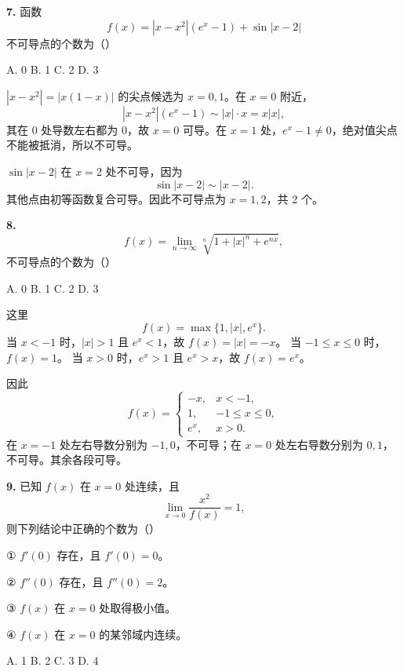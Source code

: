 \begin{problemblock}
\textbf{7.} 函数
\[
f(x)=|x-x^2|(e^x-1)+\sin|x-2|
\]
不可导点的个数为（\quad）

A. 0 \qquad B. 1 \qquad C. 2 \qquad D. 3
\end{problemblock}

\begin{solutionblock}
\(|x-x^2|=|x(1-x)|\) 的尖点候选为 \(x=0,1\)。在 \(x=0\) 附近，
\[
|x-x^2|(e^x-1)\sim |x|\cdot x=x|x|,
\]
其在 0 处导数左右都为 0，故 \(x=0\) 可导。在 \(x=1\) 处，\(e^x-1\ne0\)，绝对值尖点不能被抵消，所以不可导。

\(\sin|x-2|\) 在 \(x=2\) 处不可导，因为
\[
\sin|x-2|\sim |x-2|.
\]
其他点由初等函数复合可导。因此不可导点为 \(x=1,2\)，共 2 个。

\end{solutionblock}

\begin{problemblock}
\textbf{8.}
\[
f(x)=\lim_{n\to\infty}\sqrt[n]{1+|x|^n+e^{nx}},
\]
不可导点的个数为（\quad）

A. 0 \qquad B. 1 \qquad C. 2 \qquad D. 3
\end{problemblock}

\begin{solutionblock}
这里
\[
f(x)=\max\{1,|x|,e^x\}.
\]
当 \(x<-1\) 时，\(|x|>1\) 且 \(e^x<1\)，故 \(f(x)=|x|=-x\)。
当 \(-1\le x\le0\) 时，\(f(x)=1\)。
当 \(x>0\) 时，\(e^x>1\) 且 \(e^x>x\)，故 \(f(x)=e^x\)。

因此
\[
f(x)=
\begin{cases}
-x,&x<-1,\\
1,&-1\le x\le0,\\
e^x,&x>0.
\end{cases}
\]
在 \(x=-1\) 处左右导数分别为 \(-1,0\)，不可导；在 \(x=0\) 处左右导数分别为 \(0,1\)，不可导。其余各段可导。

\end{solutionblock}

\begin{problemblock}
\textbf{9.} 已知 \(f(x)\) 在 \(x=0\) 处连续，且
\[
\lim_{x\to0}\frac{x^2}{f(x)}=1,
\]
则下列结论中正确的个数为（\quad）

① \(f'(0)\) 存在，且 \(f'(0)=0\)。

② \(f''(0)\) 存在，且 \(f''(0)=2\)。

③ \(f(x)\) 在 \(x=0\) 处取得极小值。

④ \(f(x)\) 在 \(x=0\) 的某邻域内连续。

A. 1 \qquad B. 2 \qquad C. 3 \qquad D. 4
\end{problemblock}

